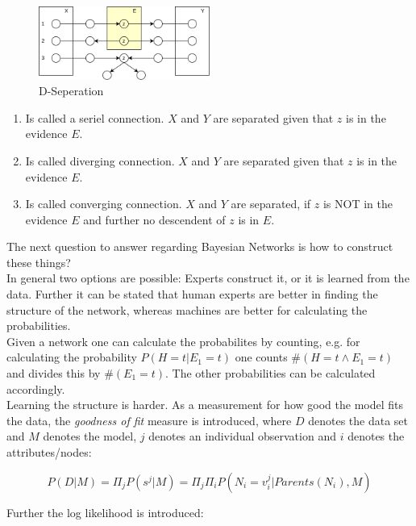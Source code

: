 \documentclass[12pt,a4paper]{article}
\begin{document}
\begin{figure}[ht]
    \begin{center}
    \includegraphics[width=0.5\textwidth]{imgs/d-sep.png}
    \caption{D-Seperation}
    \label{fig:d-sep}
    \end{center}
\end{figure}

\begin{enumerate}
    \item Is called a seriel connection. \(X\) and \(Y\) are separated given that \(z\) is in the evidence \(E\).
    \item Is called diverging connection. \(X\) and \(Y\) are separated given that \(z\) is in the evidence \(E\).
    \item Is called converging connection. \(X\) and \(Y\) are separated, if \(z\) is NOT in the evidence \(E\) and further no descendent of \(z\) is in \(E\).
\end{enumerate}

\noindent The next question to answer regarding Bayesian Networks is how to construct these things?\\
In general two options are possible: Experts construct it, or it is learned from the data. Further it can be stated that human experts are better in finding the structure of the network, whereas machines are better for calculating the probabilities.\\
Given a network one can calculate the probabilites by counting, e.g. for calculating the probability \(P(H = t | E_1 = t)\) one counts \(\#(H = t \land E_1 = t)\) and divides this by \(\#(E_1 = t)\). The other probabilities can be calculated accordingly.\\
Learning the structure is harder. As a measurement for how good the model fits the data, the \textit{goodness of fit} measure is introduced, where \(D\) denotes the data set and \(M\) denotes the model, \(j\) denotes an individual observation and \(i\) denotes the attributes/nodes:

\[P(D|M) = \Pi_j P(s^j | M) = \Pi_j \Pi_i P(N_i = v_i^j | Parents(N_i), M)\]

\noindent Further the log likelihood is introduced:
\end{document}
